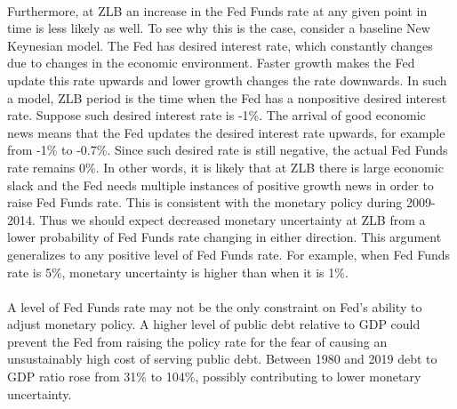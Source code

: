 \documentclass[12pt]{article}
\begin{document}
\paragraph{}
Furthermore, at ZLB an increase in the Fed Funds rate at any given point in time is less likely as well. To see why this is the case, consider a baseline New Keynesian model. The Fed has desired interest rate, which constantly changes due to changes in the economic environment. Faster growth makes the Fed update this rate upwards and lower growth changes the rate downwards. In such a model, ZLB period is the time when the Fed has a nonpositive desired interest rate. Suppose such desired interest rate is -1\%. The arrival of good economic news means that the Fed updates the desired interest rate upwards, for example from -1\% to -0.7\%. Since such desired rate is still negative, the actual Fed Funds rate remains 0\%. In other words, it is likely that at ZLB there is large economic slack and the Fed needs multiple instances of positive growth news in order to raise Fed Funds rate. This is consistent with the monetary policy during 2009-2014. Thus we should expect decreased monetary uncertainty at ZLB from a lower probability of Fed Funds rate changing in either direction. This argument generalizes to any positive level of Fed Funds rate. For example, when Fed Funds rate is 5\%, monetary uncertainty is higher than when it is 1\%.
\paragraph{}
A level of Fed Funds rate may not be the only constraint on Fed's ability to adjust monetary policy. A higher level of public debt relative to GDP could prevent the Fed from raising the policy rate for the fear of causing an unsustainably high cost of serving public debt. Between 1980 and 2019 debt to GDP ratio rose from 31\% to 104\%, possibly contributing to lower monetary uncertainty. 
\end{document}
